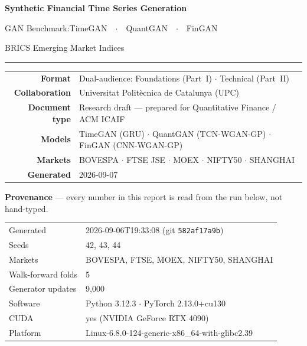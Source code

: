 \documentclass[10pt]{article}
\begin{document}
\thispagestyle{empty}
\pagecolor{Navy}\color{white}

\vspace*{2.0cm}
\begin{center}
{\fontsize{26}{32}\selectfont\bfseries Synthetic Financial Time Series Generation\par}
\vspace{0.4cm}
{\Large GAN Benchmark:\quad TimeGAN\ \ $\cdot$\ \ QuantGAN\ \ $\cdot$\ \ FinGAN\par}
\vspace{0.2cm}
{\large BRICS Emerging Market Indices\par}
\vspace{0.7cm}
\textcolor{blue!40!white}{\rule{0.65\textwidth}{0.5pt}}
\vspace{0.7cm}

\begin{tabular}{r@{\hspace{10pt}}l}
  \textbf{Format}        & Dual-audience: Foundations (Part~I) $\cdot$ Technical (Part~II) \\[4pt]
  \textbf{Collaboration} & Universitat Polit\`{e}cnica de Catalunya (UPC) \\[4pt]
  \textbf{Document type} & Research draft --- prepared for Quantitative Finance / ACM ICAIF \\[4pt]
  \textbf{Models}        & TimeGAN (GRU) $\cdot$ QuantGAN (TCN-WGAN-GP) $\cdot$ FinGAN (CNN-WGAN-GP) \\[4pt]
  \textbf{Markets}       & BOVESPA $\cdot$ FTSE JSE $\cdot$ MOEX $\cdot$ NIFTY50 $\cdot$ SHANGHAI \\[4pt]
  \textbf{Generated}     & 2026-09-07 \\
\end{tabular}
\end{center}
\clearpage\pagecolor{white}\color{black}

\begin{tcolorbox}[enhanced,arc=3pt,boxrule=0.8pt,
  colframe=Navy,colback=LBg,left=8pt,right=8pt,top=5pt,bottom=5pt]
\small\textbf{Provenance} --- every number in this report is read from the run below, not hand-typed.
\begin{tabular}{@{}ll@{}}
Generated & 2026-09-06T19:33:08 (git \texttt{582af17a9b}) \\
Seeds & 42, 43, 44 \\
Markets & BOVESPA, FTSE, MOEX, NIFTY50, SHANGHAI \\
Walk-forward folds & 5 \\
Generator updates & 9,000 \\
Software & Python 3.12.3 $\cdot$ PyTorch 2.13.0+cu130 \\
CUDA & yes (NVIDIA GeForce RTX 4090) \\
Platform & Linux-6.8.0-124-generic-x86\_64-with-glibc2.39\\
\end{tabular}
\end{tcolorbox}
\end{document}
